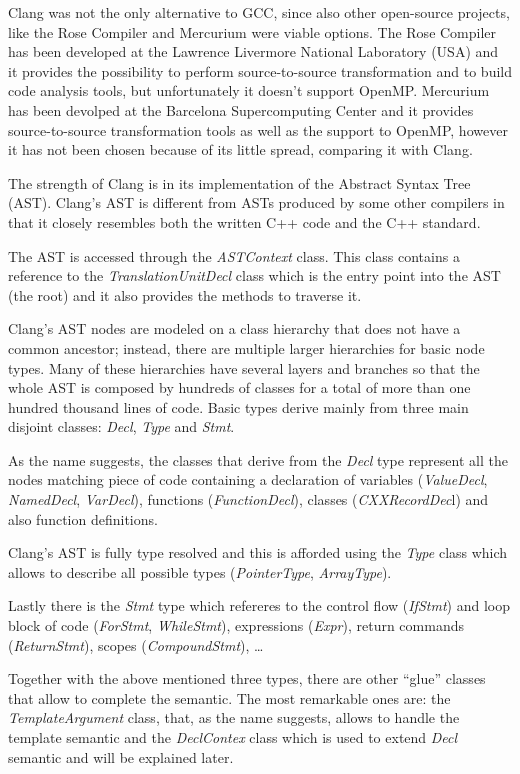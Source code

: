 \documentclass[a4paper,12pt,oneside]{book}
\begin{document}
Clang was not the only alternative to GCC, since also other open-source projects, like the Rose Compiler \cite{rose} and Mercurium \cite{mercurium} were viable options. The Rose Compiler has been developed at the Lawrence Livermore National Laboratory (USA) and it provides the possibility to perform source-to-source transformation and to build code analysis tools, but unfortunately it doesn't support OpenMP. Mercurium has been devolped at the Barcelona Supercomputing Center and it provides source-to-source transformation tools as well as the support to OpenMP, however it has not been chosen because of its little spread, comparing it with Clang. 

The strength of Clang is in its implementation of the Abstract Syntax Tree (AST). Clang’s AST is different from ASTs produced by some other compilers in that it closely resembles both the written C++ code and the C++ standard.

The AST is accessed through the \emph{ASTContext} class. This class contains a reference to the \emph{TranslationUnitDecl} class which is the entry point into the AST (the root) and it also provides the methods to traverse it.

Clang’s AST nodes are modeled on a class hierarchy that does not have a common ancestor; instead, there are multiple larger hierarchies for basic node types. Many of these hierarchies have several layers and branches so that the whole AST is composed by hundreds of classes for a total of more than one hundred thousand lines of code. Basic types derive mainly from three main disjoint classes: \emph{Decl}, \emph{Type} and \emph{Stmt}. 

As the name suggests, the classes that derive from the \emph{Decl} type represent all the nodes matching piece of code containing a declaration of variables (\emph{ValueDecl}, \emph{NamedDecl}, \emph{VarDecl}), functions (\emph{FunctionDecl}), classes (\emph{CXXRecordDec}l) and also function definitions.

Clang’s AST is fully type resolved and this is afforded using the \emph{Type} class which allows to describe all possible types (\emph{PointerType}, \emph{ArrayType}).

Lastly there is the \emph{Stmt} type which refereres to the control flow (\emph{IfStmt}) and loop block of code (\emph{ForStmt}, \emph{WhileStmt}), expressions (\emph{Expr}), return commands (\emph{ReturnStmt}), scopes (\emph{CompoundStmt}), \dots 

Together with the above mentioned three types, there are other “glue” classes that allow to complete the semantic. The most remarkable ones are: the \emph{TemplateArgument} class, that, as the name suggests, allows to handle the template semantic and the \emph{DeclContex} class which is used to extend \emph{Decl} semantic and will be explained later. 
\end{document}
